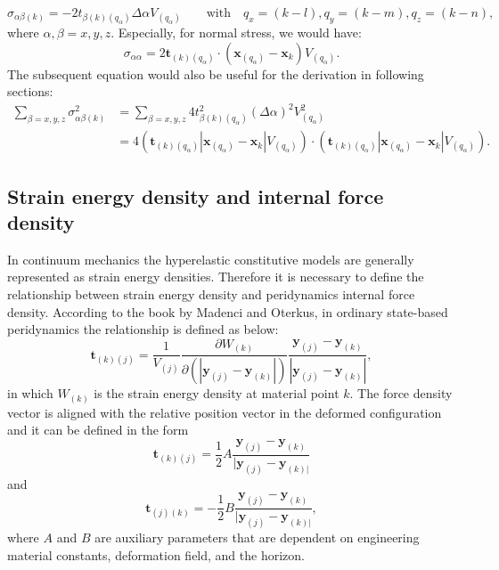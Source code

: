\documentclass[11pt,fullpage]{article}
\newcommand{\mb}[1]{\mathbf{#1}}
\newcommand{\blue}[1]{{\color{blue}{{#1}}}}
\begin{document}
\begin{equation}
\sigma_{\alpha\beta(k)} = -2t_{\beta(k)(q_\alpha)}\Delta\alpha V_{(q_\alpha)}\qquad \mathrm{with } \quad q_x=(k-l),q_y=(k-m),q_z=(k-n),
\label{eq:8}
\end{equation}
where $\alpha,\beta=x,y,z$. Especially, for normal stress, we would have:
\begin{equation}
\sigma_{\alpha\alpha} = 2 \mb{t}_{(k)(q_\alpha)}\cdot(\mb{x}_{(q_\alpha)}-\mb{x}_{k})V_{(q_\alpha)}.
\label{eq:9}
\end{equation}
The subsequent equation would also be useful for the derivation in following sections:
\begin{equation}
\begin{aligned}
\sum_{\beta=x,y,z}\sigma_{\alpha\beta(k)}^2 &= \sum_{\beta=x,y,z}4t_{\beta(k)(q_\alpha)}^2(\Delta\alpha)^2 V_{(q_\alpha)}^2 \\
                                            &= 4(\mb{t}_{(k)(q_\alpha)}|\mb{x}_{(q_\alpha)}-\mb{x}_{k}|V_{(q_\alpha)})
                                                 \cdot
                                                (\mb{t}_{(k)(q_\alpha)}|\mb{x}_{(q_\alpha)}-\mb{x}_{k}|V_{(q_\alpha)}).
\end{aligned}
\label{eq:10}
\end{equation}

\subsection{Strain energy density and internal force density}

In continuum mechanics the hyperelastic constitutive models are generally represented as strain energy densities. Therefore it is necessary to define the relationship between strain energy density and peridynamics internal force density. According to the book by Madenci and Oterkus\blue{\cite{madenci2014peridynamic}}, in ordinary state-based peridynamics the relationship is defined as below:
\begin{equation}
\mb{t}_{(k)(j)}=\frac{1}{V_{(j)}}\frac{\partial W_{(k)}}{\partial (|\mb{y}_{(j)}-\mb{y}_{(k)}|)}\frac{\mb{y}_{(j)}-\mb{y}_{(k)}}{|\mb{y}_{(j)}-\mb{y}_{(k)}|},
\label{eq:11}
\end{equation}
in which $W_{(k)}$ is the strain energy density at material point $k$. The force density vector is aligned with the relative position vector in the deformed configuration and it can be defined in the form
\begin{equation}
\mb{t}_{(k)(j)} = \frac{1}{2}A\frac{\mb{y}_{(j)}-\mb{y}_{(k)}}{|\mb{y}_{(j)}-\mb{y}_{(k)|}}
\label{eq:12}
\end{equation}
and
\begin{equation}
\mb{t}_{(j)(k)} = -\frac{1}{2}B\frac{\mb{y}_{(j)}-\mb{y}_{(k)}}{|\mb{y}_{(j)}-\mb{y}_{(k)|}},
\label{eq:13}
\end{equation}
where $A$ and $B$ are auxiliary parameters that are dependent on engineering material constants, deformation field, and the horizon.
\end{document}
